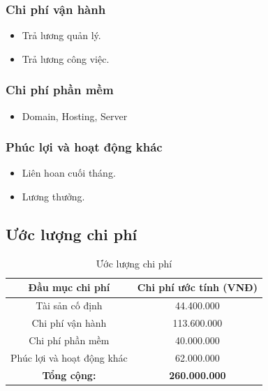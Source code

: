 \subsubsection{Chi phí vận hành}
\begin{itemize}
    \item Trả lương quản lý.
    \item Trả lương công việc.
\end{itemize}

\subsubsection{Chi phí phần mềm}
\begin{itemize}
    \item Domain, Hosting, Server
\end{itemize}

\subsubsection{Phúc lợi và hoạt động khác}
\begin{itemize}
    \item Liên hoan cuối tháng.
    \item Lương thưởng.
\end{itemize}

\subsection{Ước lượng chi phí}
\begin{table}[H]
    \caption{Ước lượng chi phí}
    \centering
    \renewcommand{\arraystretch}{1.5} %
    \begin{tabular}{|c|c|}
        \hline
        \textbf{Đầu mục chi phí}                  & \textbf{Chi phí ước tính (VNĐ)} \\
        \hline
        Tài sản cố định                           & 44.400.000                      \\
        \hline
        Chi phí vận hành                          & 113.600.000                     \\
        \hline
        Chi phí phần mềm                          & 40.000.000                      \\
        \hline
        Phúc lợi và hoạt động khác                & 62.000.000                      \\
        \hline
        \multicolumn{1}{|c|}{\textbf{Tổng cộng:}} & \textbf{260.000.000}            \\
        \hline
    \end{tabular}
\end{table}

